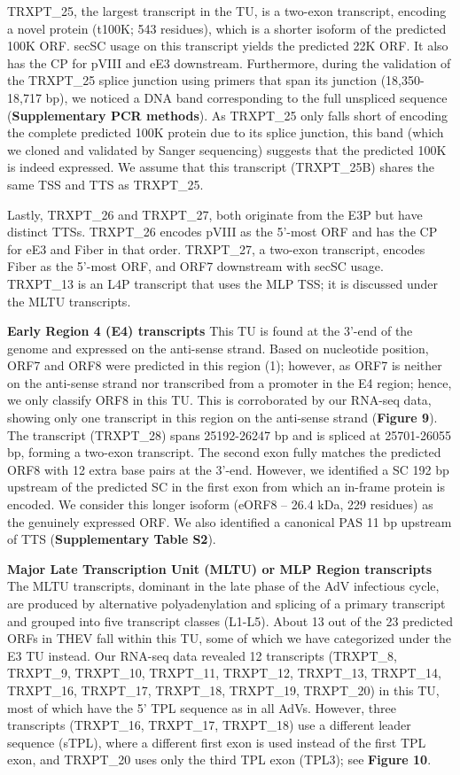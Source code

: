 \documentclass[
]{article}
\begin{document}
TRXPT\_25, the largest transcript in the TU, is a two-exon transcript,
encoding a novel protein (t100K; 543 residues), which is a shorter
isoform of the predicted 100K ORF. secSC usage on this transcript yields
the predicted 22K ORF. It also has the CP for pVIII and eE3 downstream.
Furthermore, during the validation of the TRXPT\_25 splice junction
using primers that span its junction (18,350-18,717 bp), we noticed a
DNA band corresponding to the full unspliced sequence
(\textbf{Supplementary PCR methods}). As TRXPT\_25 only falls short of
encoding the complete predicted 100K protein due to its splice junction,
this band (which we cloned and validated by Sanger sequencing) suggests
that the predicted 100K is indeed expressed. We assume that this
transcript (TRXPT\_25B) shares the same TSS and TTS as TRXPT\_25.

Lastly, TRXPT\_26 and TRXPT\_27, both originate from the E3P but have
distinct TTSs. TRXPT\_26 encodes pVIII as the 5'-most ORF and has the CP
for eE3 and Fiber in that order. TRXPT\_27, a two-exon transcript,
encodes Fiber as the 5'-most ORF, and ORF7 downstream with secSC usage.
TRXPT\_13 is an L4P transcript that uses the MLP TSS; it is discussed
under the MLTU transcripts.

\textbf{Early Region 4 (E4) transcripts} This TU is found at the 3'-end
of the genome and expressed on the anti-sense strand. Based on
nucleotide position, ORF7 and ORF8 were predicted in this region (1);
however, as ORF7 is neither on the anti-sense strand nor transcribed
from a promoter in the E4 region; hence, we only classify ORF8 in this
TU. This is corroborated by our RNA-seq data, showing only one
transcript in this region on the anti-sense strand (\textbf{Figure 9}).
The transcript (TRXPT\_28) spans 25192-26247 bp and is spliced at
25701-26055 bp, forming a two-exon transcript. The second exon fully
matches the predicted ORF8 with 12 extra base pairs at the 3'-end.
However, we identified a SC 192 bp upstream of the predicted SC in the
first exon from which an in-frame protein is encoded. We consider this
longer isoform (eORF8 -- 26.4 kDa, 229 residues) as the genuinely
expressed ORF. We also identified a canonical PAS 11 bp upstream of TTS
(\textbf{Supplementary Table S2}).

\textbf{Major Late Transcription Unit (MLTU) or MLP Region
transcripts}\\
The MLTU transcripts, dominant in the late phase of the AdV infectious
cycle, are produced by alternative polyadenylation and splicing of a
primary transcript and grouped into five transcript classes (L1-L5).
About 13 out of the 23 predicted ORFs in THEV fall within this TU, some
of which we have categorized under the E3 TU instead. Our RNA-seq data
revealed 12 transcripts (TRXPT\_8, TRXPT\_9, TRXPT\_10, TRXPT\_11,
TRXPT\_12, TRXPT\_13, TRXPT\_14, TRXPT\_16, TRXPT\_17, TRXPT\_18,
TRXPT\_19, TRXPT\_20) in this TU, most of which have the 5' TPL sequence
as in all AdVs. However, three transcripts (TRXPT\_16, TRXPT\_17,
TRXPT\_18) use a different leader sequence (sTPL), where a different
first exon is used instead of the first TPL exon, and TRXPT\_20 uses
only the third TPL exon (TPL3); see \textbf{Figure 10}.
\end{document}
